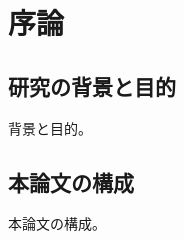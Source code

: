 \chapter{序論}
\thispagestyle{plain}
\label{introduction}

\section{研究の背景と目的}

背景と目的。

\section{本論文の構成}

本論文の構成。

